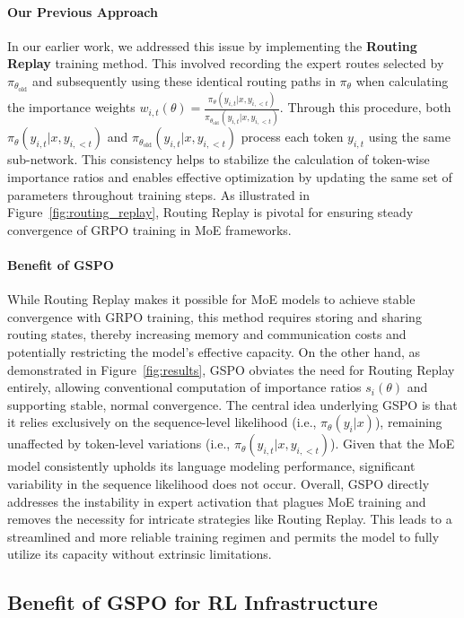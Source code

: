 \paragraph{Our Previous Approach} In our earlier work, we addressed this issue by implementing the \textbf{Routing Replay} training method. This involved recording the expert routes selected by $\pi_{\theta_\text{old}}$ and subsequently using these identical routing paths in $\pi_{\theta}$ when calculating the importance weights $w_{i,t}(\theta) = \frac{ \pi_{\theta} (y_{i,t} | x, y_{i,<t}) }{ \pi_{\theta_\text{old}} (y_{i,t} | x,y_{i,<t})}$. Through this procedure, both $\pi_{\theta} (y_{i,t} | x, y_{i,<t})$ and $\pi_{\theta_\text{old}} (y_{i,t} | x,y_{i,<t})$ process each token $y_{i,t}$ using the same sub-network. This consistency helps to stabilize the calculation of token-wise importance ratios and enables effective optimization by updating the same set of parameters throughout training steps. As illustrated in Figure~\ref{fig:routing_replay}, Routing Replay is pivotal for ensuring steady convergence of GRPO training in MoE frameworks.

\paragraph{Benefit of GSPO} While Routing Replay makes it possible for MoE models to achieve stable convergence with GRPO training, this method requires storing and sharing routing states, thereby increasing memory and communication costs and potentially restricting the model’s effective capacity. On the other hand, as demonstrated in Figure~\ref{fig:results}, GSPO obviates the need for Routing Replay entirely, allowing conventional computation of importance ratios $s_i(\theta)$ and supporting stable, normal convergence. The central idea underlying GSPO is that it relies exclusively on the sequence-level likelihood (i.e., $\pi_{\theta} (y_i | x)$), remaining unaffected by token-level variations (i.e., $\pi_{\theta} (y_{i,t} | x, y_{i,<t})$). Given that the MoE model consistently upholds its language modeling performance, significant variability in the sequence likelihood does not occur. Overall, GSPO directly addresses the instability in expert activation that plagues MoE training and removes the necessity for intricate strategies like Routing Replay. This leads to a streamlined and more reliable training regimen and permits the model to fully utilize its capacity without extrinsic limitations.

\subsection{Benefit of GSPO for RL Infrastructure}

